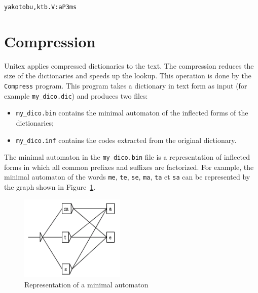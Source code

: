 \verb+yakotobu,ktb.V:aP3ms+

\section{Compression}

Unitex applies compressed dictionaries to the text. The compression reduces the
size of the dictionaries and speeds up the lookup. This operation is done by the
\verb+Compress+ program. This program takes a dictionary in text form 
as input (for example \verb+my_dico.dic+) and produces two files:

\begin{itemize}
  \item \verb+my_dico.bin+ contains the minimal automaton of the inflected forms of the dictionaries;
  \item \verb+my_dico.inf+ contains the codes extracted from the original dictionary.
\end{itemize}

\noindent The minimal automaton in the \verb+my_dico.bin+ file is a
representation of inflected forms in which all common prefixes and suffixes are factorized. For
example, the minimal automaton of the words \verb+me+, \verb+te+, \verb+se+,
\verb+ma+, \verb+ta+ et \verb+sa+ can be represented by the graph shown in
Figure~\ref{fig-example-minimal-automaton}. \bigskip \begin{figure}[!h]
\begin{center}
\includegraphics[width=5cm]{resources/img/fig3-10.png}
\caption{Representation of a minimal
automaton\label{fig-example-minimal-automaton}}
\end{center}
\end{figure}

